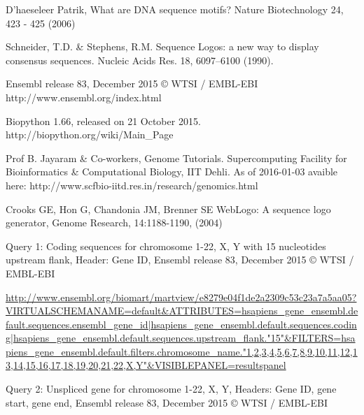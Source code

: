 \documentclass[10pt,letterpaper]{article}
\begin{document}
\nolinenumbers

%
%
%
\newpage
\begin{thebibliography}{10}

D'haeseleer Patrik, What are DNA sequence motifs? Nature Biotechnology 24, 423 - 425 (2006)

Schneider, T.D. \& Stephens, R.M. Sequence Logos: a new way to display consensus sequences. Nucleic Acids Res. 18, 6097–6100 (1990).

Ensembl release 83, December 2015 © WTSI / EMBL-EBI
http://www.ensembl.org/index.html

Biopython 1.66, released on 21 October 2015.
http://biopython.org/wiki/Main\_Page

Prof B. Jayaram \& Co-workers, Genome Tutorials. Supercomputing Facility for Bioinformatics \& Computational Biology, IIT Dehli.
As of 2016-01-03 avaible here:
http://www.scfbio-iitd.res.in/research/genomics.html

Crooks GE, Hon G, Chandonia JM, Brenner SE WebLogo: A sequence logo generator, Genome Research, 14:1188-1190, (2004)

Query 1: Coding sequences for chromosome 1-22, X, Y with 15 nucleotides upstream flank, Header: Gene ID, Ensembl release 83, December 2015 © WTSI / EMBL-EBI

\url{http://www.ensembl.org/biomart/martview/e8279e04f1de2a2309c53c23a7a5aa05?VIRTUALSCHEMANAME=default&ATTRIBUTES=hsapiens_gene_ensembl.default.sequences.ensembl_gene_id|hsapiens_gene_ensembl.default.sequences.coding|hsapiens_gene_ensembl.default.sequences.upstream_flank."15"&FILTERS=hsapiens_gene_ensembl.default.filters.chromosome_name."1,2,3,4,5,6,7,8,9,10,11,12,13,14,15,16,17,18,19,20,21,22,X,Y"&VISIBLEPANEL=resultspanel}

Query 2: Unspliced gene for chromosome 1-22, X, Y, Headers: Gene ID, gene start, gene end, Ensembl release 83, December 2015 © WTSI / EMBL-EBI


\end{thebibliography}
\end{document}
